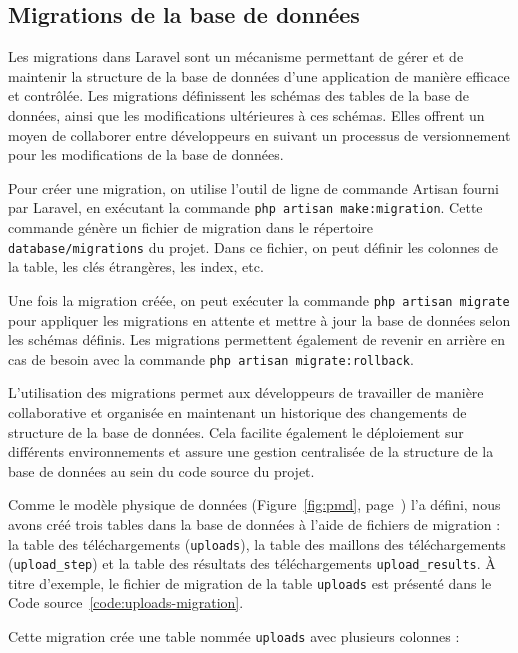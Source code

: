 \subsection{Migrations de la base de données}

Les migrations dans Laravel sont un mécanisme permettant de gérer et de maintenir la structure de la base de données d'une application de manière efficace et contrôlée. Les migrations définissent les schémas des tables de la base de données, ainsi que les modifications ultérieures à ces schémas. Elles offrent un moyen de collaborer entre développeurs en suivant un processus de versionnement pour les modifications de la base de données.

Pour créer une migration, on utilise l'outil de ligne de commande Artisan fourni par Laravel, en exécutant la commande \Verb|php artisan make:migration|. Cette commande génère un fichier de migration dans le répertoire \Verb|database/migrations| du projet. Dans ce fichier, on peut définir les colonnes de la table, les clés étrangères, les index, etc.

Une fois la migration créée, on peut exécuter la commande \Verb|php artisan migrate| pour appliquer les migrations en attente et mettre à jour la base de données selon les schémas définis. Les migrations permettent également de revenir en arrière en cas de besoin avec la commande \Verb|php artisan migrate:rollback|.

L'utilisation des migrations permet aux développeurs de travailler de manière collaborative et organisée en maintenant un historique des changements de structure de la base de données. Cela facilite également le déploiement sur différents environnements et assure une gestion centralisée de la structure de la base de données au sein du code source du projet.

Comme le modèle physique de données (Figure~\ref{fig:pmd}, page~\pageref{fig:pmd}) l'a défini, nous avons créé trois tables dans la base de données à l'aide de fichiers de migration : la table des téléchargements (\Verb|uploads|), la table des maillons des téléchargements (\Verb|upload_step|) et la table des résultats des téléchargements \Verb|upload_results|. À titre d'exemple, le fichier de migration de la table \Verb|uploads| est présenté dans le Code source~\ref{code:uploads-migration}.

Cette migration crée une table nommée \Verb|uploads| avec plusieurs colonnes :

